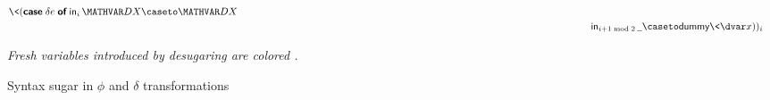 \begin{figure}
\begin{align*}
    \<(\emcase{\delta e}
    \inj i \mvar\dx \caseto \mvar\dx
    \\
    &\qquad\phantom{(\inj i {\mvar y} \caseto {} (\efn{\dx} \delta f_i) \<(\emcase{\delta e}}
    \inj{i+1 \bmod 2} \pwild \caseto \dummy\<\dvar x
    ))_i
  \end{align*}

  \centering\itshape
  Fresh variables introduced by desugaring are colored {\color{fresh}\freshname}.

  \caption{Syntax sugar in $\phi$ and $\delta$ transformations}
  \label{appendix-seminaive-syntax-sugar}
\end{figure}
